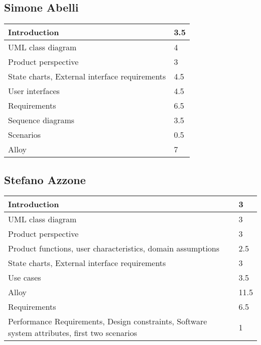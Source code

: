 \subsection{Simone Abelli}
\begin{tabular} { | m{5cm} | m{1cm} | }
	\hline
	Introduction & 3.5\\
	\hline
	UML class diagram & 4\\
	\hline
	Product perspective & 3\\
	\hline
	State charts, External interface requirements & 4.5\\
	\hline
	User interfaces & 4.5\\
	\hline
	Requirements & 6.5\\
	\hline
	Sequence diagrams & 3.5\\
	\hline
	Scenarios & 0.5\\
	\hline
	Alloy & 7\\
	\hline
\end{tabular}

\subsection{Stefano Azzone}
\begin{tabular} { | m{5cm} | m{1cm} | }
	\hline
	Introduction & 3\\
	\hline
	UML class diagram & 3\\
	\hline
	Product perspective & 3\\
	\hline
	Product functions, user characteristics, domain assumptions & 2.5\\
	\hline
	State charts, External interface requirements & 3\\
	\hline
	Use cases & 3.5\\
	\hline
	Alloy & 11.5\\
	\hline
	Requirements & 6.5\\
	\hline
	Performance Requirements, Design constraints, Software system attributes, first two scenarios & 1\\
	\hline
\end{tabular}